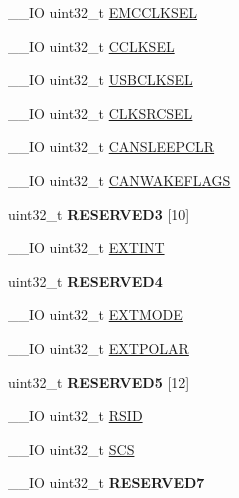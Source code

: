 \begin{DoxyCompactItemize}
\item 
\+\_\+\+\_\+\+I\+O uint32\+\_\+t \hyperlink{struct_l_p_c___s_y_s_c_t_l___t_a23152315a7ac650737bf1b3852bab194}{E\+M\+C\+C\+L\+K\+S\+E\+L}
\item 
\+\_\+\+\_\+\+I\+O uint32\+\_\+t \hyperlink{struct_l_p_c___s_y_s_c_t_l___t_a5cebc138aa8f8591199efafea7bc316f}{C\+C\+L\+K\+S\+E\+L}
\item 
\+\_\+\+\_\+\+I\+O uint32\+\_\+t \hyperlink{struct_l_p_c___s_y_s_c_t_l___t_a6d004c6e6657a7fe78e75bd3e3ea00c4}{U\+S\+B\+C\+L\+K\+S\+E\+L}
\item 
\+\_\+\+\_\+\+I\+O uint32\+\_\+t \hyperlink{struct_l_p_c___s_y_s_c_t_l___t_a0ddcaa3fe7ae45dfee7e17f6ec93138e}{C\+L\+K\+S\+R\+C\+S\+E\+L}
\item 
\+\_\+\+\_\+\+I\+O uint32\+\_\+t \hyperlink{struct_l_p_c___s_y_s_c_t_l___t_aa6166dc2b9f99af318dfb44c259cff81}{C\+A\+N\+S\+L\+E\+E\+P\+C\+L\+R}
\item 
\+\_\+\+\_\+\+I\+O uint32\+\_\+t \hyperlink{struct_l_p_c___s_y_s_c_t_l___t_a4fee9b64e430f37988fe1fb566f6577e}{C\+A\+N\+W\+A\+K\+E\+F\+L\+A\+G\+S}
\item 
\hypertarget{struct_l_p_c___s_y_s_c_t_l___t_a5daf9fed4694c5fdd04d46858de11e8e}{uint32\+\_\+t {\bfseries R\+E\+S\+E\+R\+V\+E\+D3} \mbox{[}10\mbox{]}}\label{struct_l_p_c___s_y_s_c_t_l___t_a5daf9fed4694c5fdd04d46858de11e8e}

\item 
\+\_\+\+\_\+\+I\+O uint32\+\_\+t \hyperlink{struct_l_p_c___s_y_s_c_t_l___t_ac394af46f7dc8a036a574980c62ff769}{E\+X\+T\+I\+N\+T}
\item 
\hypertarget{struct_l_p_c___s_y_s_c_t_l___t_a53453664006957e4e8c6d479adcadcef}{uint32\+\_\+t {\bfseries R\+E\+S\+E\+R\+V\+E\+D4}}\label{struct_l_p_c___s_y_s_c_t_l___t_a53453664006957e4e8c6d479adcadcef}

\item 
\+\_\+\+\_\+\+I\+O uint32\+\_\+t \hyperlink{struct_l_p_c___s_y_s_c_t_l___t_a22607cf2c4669efe70eae5746f74a33c}{E\+X\+T\+M\+O\+D\+E}
\item 
\+\_\+\+\_\+\+I\+O uint32\+\_\+t \hyperlink{struct_l_p_c___s_y_s_c_t_l___t_a7d0423c5e3f7482182c229bbc4b2b83b}{E\+X\+T\+P\+O\+L\+A\+R}
\item 
\hypertarget{struct_l_p_c___s_y_s_c_t_l___t_abca81e13877281a3a264db320587dd01}{uint32\+\_\+t {\bfseries R\+E\+S\+E\+R\+V\+E\+D5} \mbox{[}12\mbox{]}}\label{struct_l_p_c___s_y_s_c_t_l___t_abca81e13877281a3a264db320587dd01}

\item 
\+\_\+\+\_\+\+I\+O uint32\+\_\+t \hyperlink{struct_l_p_c___s_y_s_c_t_l___t_a50cd4f8d03ea4b39516add82ac2dfd1a}{R\+S\+I\+D}
\item 
\+\_\+\+\_\+\+I\+O uint32\+\_\+t \hyperlink{struct_l_p_c___s_y_s_c_t_l___t_a90bf168dbcc04b27d230b74b5e4d17a6}{S\+C\+S}
\item 
\hypertarget{struct_l_p_c___s_y_s_c_t_l___t_a0cd1931e0f0768d7d450f68b734a7b16}{\+\_\+\+\_\+\+I\+O uint32\+\_\+t {\bfseries R\+E\+S\+E\+R\+V\+E\+D7}}\label{struct_l_p_c___s_y_s_c_t_l___t_a0cd1931e0f0768d7d450f68b734a7b16}


\end{DoxyCompactItemize}
